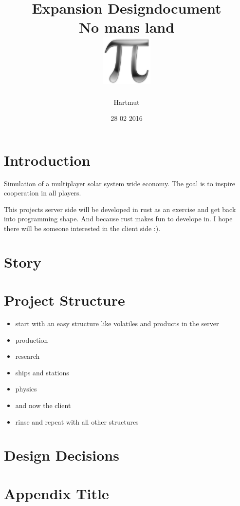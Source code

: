 \documentclass[a4paper,10pt]{book}
\title{
	{Expansion Designdocument}\\
	{\large No mans land}\\
	{\includegraphics{pi-black.png}}
}
\author{Hartmut}
\date{28 02 2016}
\begin{document}
\maketitle

\tableofcontents
\chapter{Introduction}
Simulation of a multiplayer solar system wide economy.
The goal is to inspire cooperation in all players.

This projects server side will be developed in rust as an exercise and get back into 
programming shape. And because rust makes fun to develope in. I hope there will be someone
interested in the client side :).

\chapter{Story}


\chapter{Project Structure}
\begin{itemize}
 \item start with an easy structure like volatiles and products in the server
 \item production
 \item research
 \item ships and stations
 \item physics
 \item and now the client
 \item rinse and repeat with all other structures
\end{itemize}


\chapter{Design Decisions}


\appendix
\chapter{Appendix Title}

\end{document}
